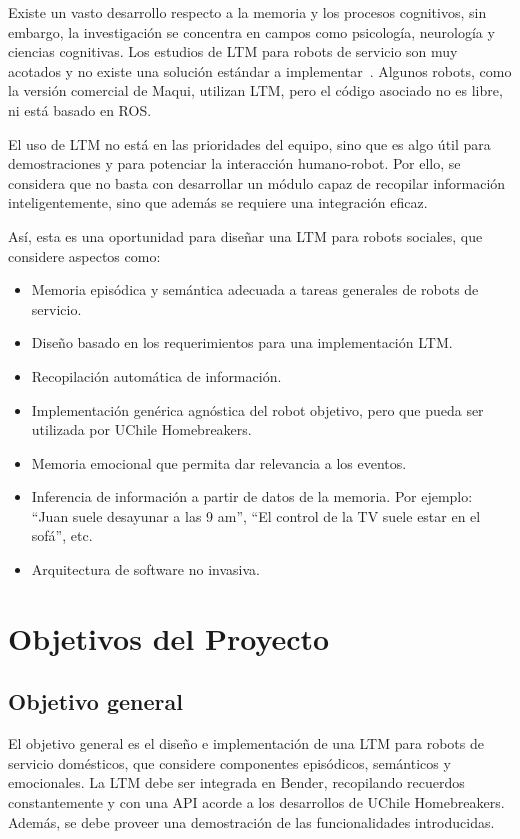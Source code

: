 Existe un vasto desarrollo respecto a la memoria y los procesos cognitivos, sin embargo, la investigación se concentra en campos como psicología, neurología y ciencias cognitivas. Los estudios de LTM para robots de servicio son muy acotados y no existe una solución estándar a implementar~\cite{ltm_in_robocup}. Algunos robots, como la versión comercial de Maqui, utilizan LTM, pero el código asociado no es libre, ni está basado en ROS.

El uso de LTM no está en las prioridades del equipo, sino que es algo útil para demostraciones y para potenciar la interacción humano-robot. Por ello, se considera que no basta con desarrollar un módulo capaz de recopilar información inteligentemente, sino que además se requiere una integración eficaz.

Así, esta es una oportunidad para diseñar una LTM para robots sociales, que considere aspectos como: 
\begin{itemize}
	\item Memoria episódica y semántica adecuada a tareas generales de robots de servicio.
	\item Diseño basado en los requerimientos para una implementación LTM.
	\item Recopilación automática de información.
	\item Implementación genérica agnóstica del robot objetivo, pero que pueda ser utilizada por UChile Homebreakers.
	\item Memoria emocional que permita dar relevancia a los eventos.
	\item Inferencia de información a partir de datos de la memoria. Por ejemplo: ``Juan suele desayunar a las 9 am'', ``El control de la TV suele estar en el sofá'', etc.
	\item Arquitectura de software no invasiva.
\end{itemize}



\section{Objetivos del Proyecto}\label{sec:objetivos}

\subsection{Objetivo general}

El objetivo general es el diseño e implementación de una LTM para robots de servicio domésticos, que considere componentes episódicos, semánticos y emocionales. La LTM debe ser integrada en Bender, recopilando recuerdos constantemente y con una API acorde a los desarrollos de UChile Homebreakers. Además, se debe proveer una demostración de las funcionalidades introducidas.


